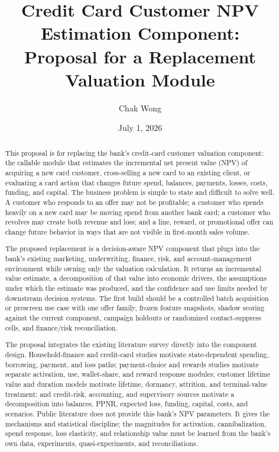\documentclass[11pt]{article}
\title{Credit Card Customer NPV Estimation Component:\\
Proposal for a Replacement Valuation Module}
\author{Chak Wong}
\date{July 1, 2026}
\newcommand{\1}{\mathbf{1}}
\begin{document}
\maketitle

\begin{abstract}
This proposal is for replacing the bank's credit-card customer valuation
component: the callable module that estimates the incremental net present value
(NPV) of acquiring a new card customer, cross-selling a new card to an existing
client, or evaluating a card action that changes future spend, balances,
payments, losses, costs, funding, and capital. The business problem is simple to
state and difficult to solve well. A customer who responds to an offer may not
be profitable; a customer who spends heavily on a new card may be moving spend
from another bank card; a customer who revolves may create both revenue and
loss; and a line, reward, or promotional offer can change future behavior in
ways that are not visible in first-month sales volume.

The proposed replacement is a decision-aware NPV component that plugs into the
bank's existing marketing, underwriting, finance, risk, and account-management
environment while owning only the valuation calculation. It returns an
incremental value estimate, a decomposition of that value into economic drivers,
the assumptions under which the estimate was produced, and the confidence and
use limits needed by downstream decision systems. The first build should be a
controlled batch acquisition or prescreen use case with one offer family, frozen
feature snapshots, shadow scoring against the current component, campaign
holdouts or randomized contact-suppress cells, and finance/risk reconciliation.

The proposal integrates the existing literature survey directly into the
component design. Household-finance and credit-card studies motivate
state-dependent spending, borrowing, payment, and loss paths; payment-choice
and rewards studies motivate separate activation, use, wallet-share, and reward
response modules; customer lifetime value and duration models motivate
lifetime, dormancy, attrition, and terminal-value treatment; and credit-risk,
accounting, and supervisory sources motivate a decomposition into balances,
PPNR, expected loss, funding, capital, costs, and scenarios. Public literature
does not provide this bank's NPV parameters. It gives the mechanisms and
statistical discipline; the magnitudes for activation, cannibalization, spend
response, loss elasticity, and relationship value must be learned from the
bank's own data, experiments, quasi-experiments, and reconciliations.
\end{abstract}
\end{document}
